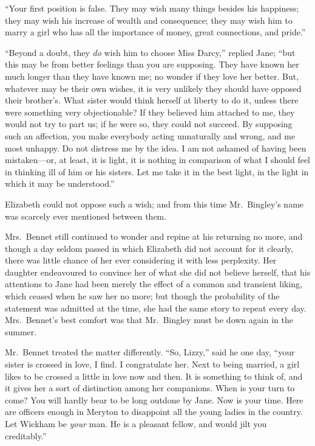 \documentclass[12pt,english]{book}
\begin{document}
{}``Your first position is false. They may wish many things besides
his happiness; they may wish his increase of wealth and consequence;
they may wish him to marry a girl who has all the importance of money,
great connections, and pride.''

{}``Beyond a doubt, they \textit{do} wish him to choose Miss Darcy,''
replied Jane; {}``but this may be from better feelings than you are
supposing. They have known her much longer than they have known me;
no wonder if they love her better. But, whatever may be their own
wishes, it is very unlikely they should have opposed their brother's.
What sister would think herself at liberty to do it, unless there
were something very objectionable? If they believed him attached to
me, they would not try to part us; if he were so, they could not succeed.
By supposing such an affection, you make everybody acting unnaturally
and wrong, and me most unhappy. Do not distress me by the idea. I
am not ashamed of having been mistaken\mbox{---}or, at least, it
is light, it is nothing in comparison of what I should feel in thinking
ill of him or his sisters. Let me take it in the best light, in the
light in which it may be understood.''

Elizabeth could not oppose such a wish; and from this time Mr.\ Bingley's
name was scarcely ever mentioned between them.

Mrs.\ Bennet still continued to wonder and repine at his returning
no more, and though a day seldom passed in which Elizabeth did not
account for it clearly, there was little chance of her ever considering
it with less perplexity. Her daughter endeavoured to convince her
of what she did not believe herself, that his attentions to Jane had
been merely the effect of a common and transient liking, which ceased
when he saw her no more; but though the probability of the statement
was admitted at the time, she had the same story to repeat every day.
Mrs.\ Bennet's best comfort was that Mr.\ Bingley must be down again
in the summer.

Mr.\ Bennet treated the matter differently. {}``So, Lizzy,'' said
he one day, {}``your sister is crossed in love, I find. I congratulate
her. Next to being married, a girl likes to be crossed a little in
love now and then. It is something to think of, and it gives her a
sort of distinction among her companions. When is your turn to come?
You will hardly bear to be long outdone by Jane. Now is your time.
Here are officers enough in Meryton to disappoint all the young ladies
in the country. Let Wickham be \textit{your} man. He is a pleasant
fellow, and would jilt you creditably.''
\end{document}
